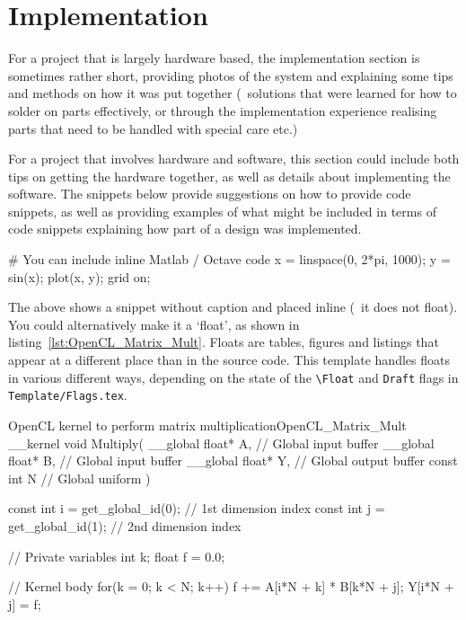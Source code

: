 \section{Implementation}

For a project that is largely hardware based, the implementation section is sometimes rather short, providing photos of the system and explaining some tips and methods on how it was put together (\eg~solutions that were learned for how to solder on parts effectively, or through the implementation experience realising parts that need to be handled with special care etc.)

For a project that involves hardware and software, this section could include both tips on getting the hardware together, as well as details about implementing the software.  The snippets below provide suggestions on how to provide code snippets, as well as providing examples of what might be included in terms of code snippets explaining how part of a design was implemented.

\begin{Matlab}
  # You can include inline Matlab / Octave code
  x = linspace(0, 2*pi, 1000);
  y = sin(x);
  plot(x, y); grid on;
\end{Matlab}

The above shows a snippet without caption and placed inline (\ie~it does not float).  You could alternatively make it a `float', as shown in listing~\ref{lst:OpenCL_Matrix_Mult}.  Floats are tables, figures and listings that appear at a different place than in the source code.  This template handles floats in various different ways, depending on the state of the \verb|\Float| and \verb|Draft| flags in \verb|Template/Flags.tex|.

\begin{OpenCL_float}{OpenCL kernel to perform matrix multiplication}{OpenCL_Matrix_Mult}
  __kernel void Multiply(
    __global float* A, // Global input buffer
    __global float* B, // Global input buffer
    __global float* Y, // Global output buffer
    const    int    N  // Global uniform
  ){
    const int i = get_global_id(0); // 1st dimension index
    const int j = get_global_id(1); // 2nd dimension index

    // Private variables
    int   k;
    float f = 0.0;

    // Kernel body
    for(k = 0; k < N; k++) f += A[i*N + k] * B[k*N + j];
    Y[i*N + j] = f;
  }
\end{OpenCL_float}

